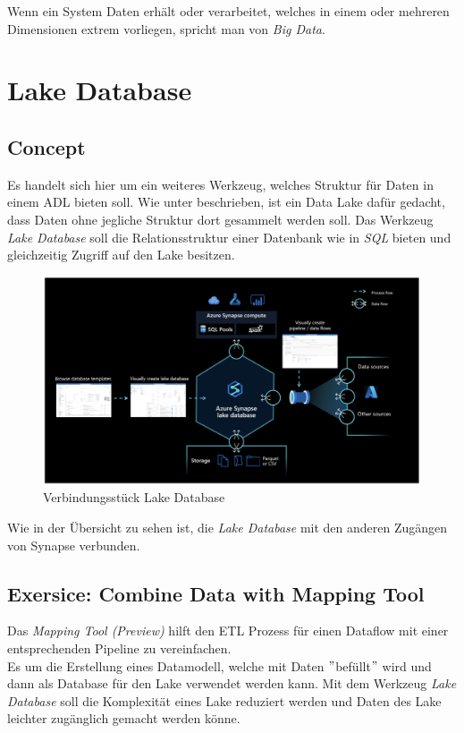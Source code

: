 Wenn ein System Daten erhält oder verarbeitet, welches in einem oder mehreren Dimensionen extrem vorliegen, spricht man von \textit{Big Data}.

\section{Lake Database}
\subsection{Concept}
Es handelt sich hier um ein weiteres Werkzeug, welches Struktur für Daten in einem \gls{ADL} bieten soll. Wie unter  beschrieben, ist ein Data Lake dafür gedacht, dass Daten ohne jegliche Struktur dort gesammelt werden soll. Das Werkzeug \textit{Lake Database} soll die Relationsstruktur einer Datenbank wie in \textit{SQL} bieten und gleichzeitig Zugriff auf den Lake besitzen.
\begin{figure}[H]
	\centering
	\includegraphics[scale = 0.2]{attachment/chapter_2/Scc137}
	\caption{Verbindungsstück Lake Database}
\end{figure}

Wie in der Übersicht zu sehen ist, die \textit{Lake Database} mit den anderen Zugängen von Synapse verbunden.


\subsection{Exersice: Combine Data with Mapping Tool}
Das \textit{Mapping Tool (Preview)} hilft den \gls{ETL} Prozess für einen Dataflow mit einer entsprechenden Pipeline zu vereinfachen.\\ 

Es um die Erstellung eines Datamodell, welche mit Daten $"$befüllt$"$ wird und dann als Database für den Lake verwendet werden kann. Mit dem Werkzeug \textit{Lake Database} soll die Komplexität eines Lake reduziert werden und Daten des Lake leichter zugänglich gemacht werden könne.

